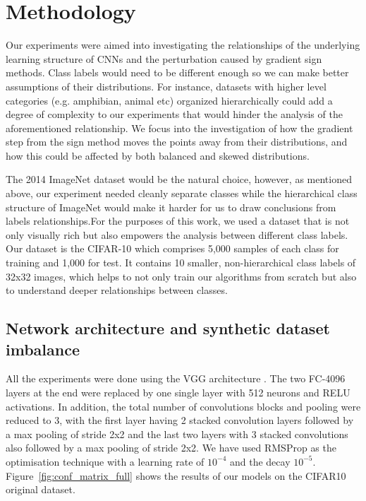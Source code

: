 \documentclass[runningheads,a4paper]{llncs}
\begin{document}
\section{Methodology}

Our experiments were aimed into investigating the relationships of the underlying learning structure of CNNs and the perturbation caused by gradient sign methods. Class labels would need to be different enough so we can make better assumptions of their distributions. For instance, datasets with higher level categories (e.g. amphibian, animal etc) organized hierarchically could add a degree of complexity to our experiments that would hinder the analysis of the aforementioned relationship. We focus into the investigation of how the gradient step from the sign method moves the points away from their distributions, and how this could be affected by both balanced and skewed distributions.

The 2014 ImageNet dataset \cite{deng2009imagenet} would be the natural choice, however, as mentioned above, our experiment needed cleanly separate classes while the hierarchical class structure of ImageNet would make it harder for us to draw conclusions from labels relationships.For the purposes of this work, we used a dataset that is not only visually rich but also empowers the analysis between different class labels. Our dataset is the CIFAR-10 which comprises 5,000 samples of each class for training and 1,000 for test. It contains 10 smaller, non-hierarchical class labels of 32x32 images, which helps to not only train our algorithms from scratch but also to understand deeper relationships between classes.
\subsection{Network architecture and synthetic dataset imbalance}

All the experiments were done using the VGG architecture \cite{simonyan2014very}. The two FC-4096 layers at the end were replaced by one single layer with 512 neurons and RELU activations. In addition, the total number of convolutions blocks and pooling were reduced to 3, with the first layer having 2 stacked convolution layers followed by a max pooling of stride 2x2 and the last two layers with 3 stacked convolutions also followed by a max pooling of stride 2x2. We have used RMSProp  \cite{bengiormsprop} as the optimisation technique with a learning rate of $10^{-4}$ and the decay $10^{-5}$. Figure~\ref{fig:conf_matrix_full} shows the results of our models on the CIFAR10 original dataset.
\end{document}

